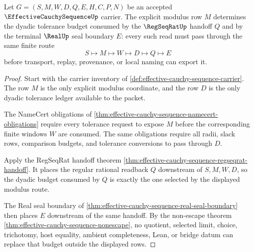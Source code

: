 \begin{theorem}
\label{thm:effective-cauchy-sequence-modulus-readback}
Let $G=(S,M,W,D,Q,E,H,C,P,N)$ be an accepted $\EffectiveCauchySequenceUp$ carrier. The explicit modulus row $M$ determines the dyadic tolerance budget consumed by the $\RegSeqRatUp$ handoff $Q$ and by the terminal $\RealUp$ seal boundary $E$: every such read must pass through the same finite route
$$
S \longmapsto M \longmapsto W \longmapsto D \longmapsto Q \longmapsto E
$$
before transport, replay, provenance, or local naming can export it.
\end{theorem}
\begin{proof}
Start with the carrier inventory of \autoref{def:effective-cauchy-sequence-carrier}. The row $M$ is the only explicit modulus coordinate, and the row $D$ is the only dyadic tolerance ledger available to the packet.

The NameCert obligations of \autoref{thm:effective-cauchy-sequence-namecert-obligations} require every tolerance request to expose $M$ before the corresponding finite windows $W$ are consumed. The same obligations require all radii, slack rows, comparison budgets, and tolerance conversions to pass through $D$.

Apply the RegSeqRat handoff theorem \autoref{thm:effective-cauchy-sequence-regseqrat-handoff}. It places the regular rational readback $Q$ downstream of $S,M,W,D$, so the dyadic budget consumed by $Q$ is exactly the one selected by the displayed modulus route.

The Real seal boundary of \autoref{thm:effective-cauchy-sequence-real-seal-boundary} then places $E$ downstream of the same handoff. By the non-escape theorem \autoref{thm:effective-cauchy-sequence-nonescape}, no quotient, selected limit, choice, trichotomy, host equality, ambient completeness, Lean, or bridge datum can replace that budget outside the displayed rows.
\end{proof}

